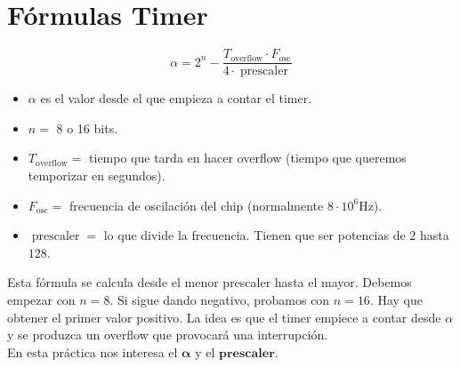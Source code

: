 \documentclass{article}
\theoremstyle{definition} %
\begin{document}
  


\newpage
\section{Fórmulas Timer}
\large
\[\alpha = 2^n - \dfrac{T_{\text{overflow}} \cdot F_{\text{osc}}}{4 \cdot \operatorname{prescaler}}\] 
\normalsize
\begin{itemize}
  

\item $\alpha$ es el valor desde el que empieza a contar el timer.

\item $n = $ 8 o 16 bits.

\item $T_{\text{overflow}} =$ tiempo que tarda en hacer overflow (tiempo que queremos temporizar en segundos).

 \item $F_{\text{osc}} = $ frecuencia de oscilación del chip (normalmente $8 \cdot 10^6$Hz).

\item $\operatorname{prescaler} = $ lo que divide la frecuencia. Tienen que ser potencias de $2$ hasta $128$.


\end{itemize}
\begin{center}

\end{center}
Esta fórmula se calcula desde el menor prescaler hasta el mayor. Debemos empezar con $n = 8$. Si sigue dando negativo, probamos con $n = 16$. 
Hay que obtener el primer valor positivo. La idea es que el timer empiece a contar desde $\alpha$ y se produzca un overflow que provocará una interrupción.
\\
En esta práctica nos interesa el $\boldsymbol{\alpha}$ y el $\mathbf{prescaler}$.
\end{document}
